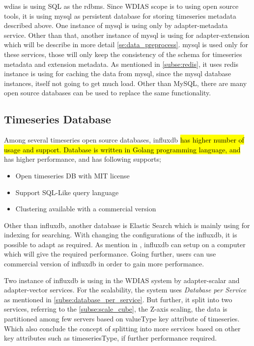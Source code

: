 \acrshort{wdias} is using SQL as the \acrfull{rdbms}. 
Since WDIAS scope is to using open source tools, it is using \acrshort{mysql} as persistent database for storing timeseries metadata described above.
One instance of \acrshort{mysql} is using only by adapter-metadata service.
Other than that, another instance of \acrshort{mysql} is using for adapter-extension which will be describe in more detail \cref{se:data_preprocess}.
\acrshort{mysql} is used only for these services, those will only keep the consistency of the schema for timeseries metadata and extension metadata.
As mentioned in \cref{subse:redis}, it uses \acrshort{redis} instance is using for caching the data from \acrshort{mysql}, since the \acrshort{mysql} database instances, itself not going to get much load.
Other than MySQL, there are many open source databases can be used to replace the same functionality.
\subsection{Timeseries Database}
\label{subse:influxdb}
Among several timeseries open source databases, \acrshort{influxdb} \cite{influxdbInfluxDBDocumentation} \hl{has higher number of usage and support. Database is written in Golang programming language, and} has higher performance, and has following supports;
\begin{itemize}
  \item Open timeseries DB with MIT license
  \item Support SQL-Like query language
  \item Clustering available with a commercial version
\end{itemize}
Other than \acrshort{influxdb}, another database is Elastic Search which is mainly using for indexing for searching.
With changing the configurations of the \acrshort{influxdb}, it is possible to adapt as required. As mention in \cite{influxdbInfluxDBDocumentation}, 
\acrshort{influxdb} can setup on a computer which will give the required performance. Going further, users can use commercial version of \acrshort{influxdb} in order to gain more performance.

Two instance of \acrshort{influxdb} is using in the WDIAS system by adapter-scalar and adapter-vector services. For the scalability, the system uses \emph{Database per Service} as mentioned in \cref{subse:database_per_service}.
But further, it split into two services, referring to the \cref{subse:scale_cube}, the Z-axis scaling, the data is partitioned among few servers based on valueType key attribute of timeseries.
Which also conclude the concept of splitting into more services based on other key attributes such as timeseriesType, if further performance required.

